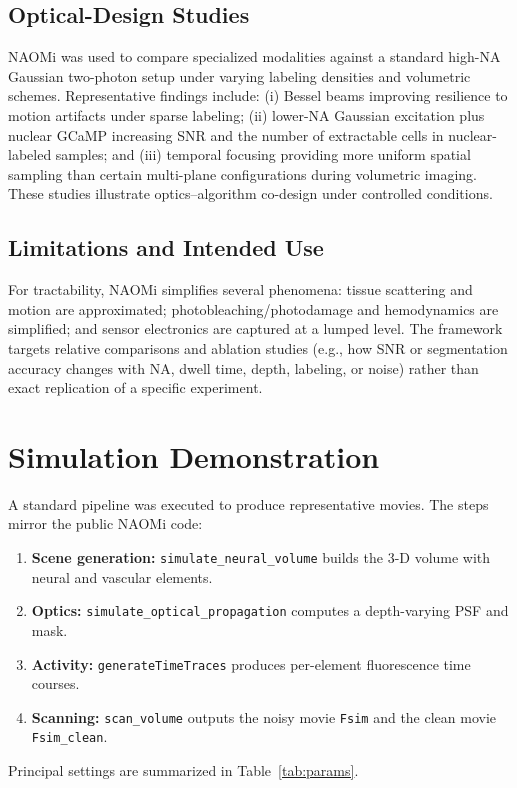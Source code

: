 \documentclass[conference]{IEEEtran}
\begin{document}
\subsection{Optical-Design Studies}
NAOMi was used to compare specialized modalities against a standard high-NA Gaussian two-photon setup under varying labeling densities and volumetric schemes. Representative findings include: (i) Bessel beams improving resilience to motion artifacts under sparse labeling; (ii) lower-NA Gaussian excitation plus nuclear GCaMP increasing SNR and the number of extractable cells in nuclear-labeled samples; and (iii) temporal focusing providing more uniform spatial sampling than certain multi-plane configurations during volumetric imaging. These studies illustrate optics--algorithm co-design under controlled conditions.

\subsection{Limitations and Intended Use}
For tractability, NAOMi simplifies several phenomena: tissue scattering and motion are approximated; photobleaching/photodamage and hemodynamics are simplified; and sensor electronics are captured at a lumped level. The framework targets relative comparisons and ablation studies (e.g., how SNR or segmentation accuracy changes with NA, dwell time, depth, labeling, or noise) rather than exact replication of a specific experiment.

\section{Simulation Demonstration}\label{sec:methods}
A standard pipeline was executed to produce representative movies. The steps mirror the public NAOMi code:
\begin{enumerate}
  \item \textbf{Scene generation:} \texttt{simulate\_neural\_volume} builds the 3-D volume with neural and vascular elements.
  \item \textbf{Optics:} \texttt{simulate\_optical\_propagation} computes a depth-varying PSF and mask.
  \item \textbf{Activity:} \texttt{generateTimeTraces} produces per-element fluorescence time courses.
  \item \textbf{Scanning:} \texttt{scan\_volume} outputs the noisy movie \texttt{Fsim} and the clean movie \texttt{Fsim\_clean}.
\end{enumerate}
Principal settings are summarized in Table~\ref{tab:params}.
\end{document}
